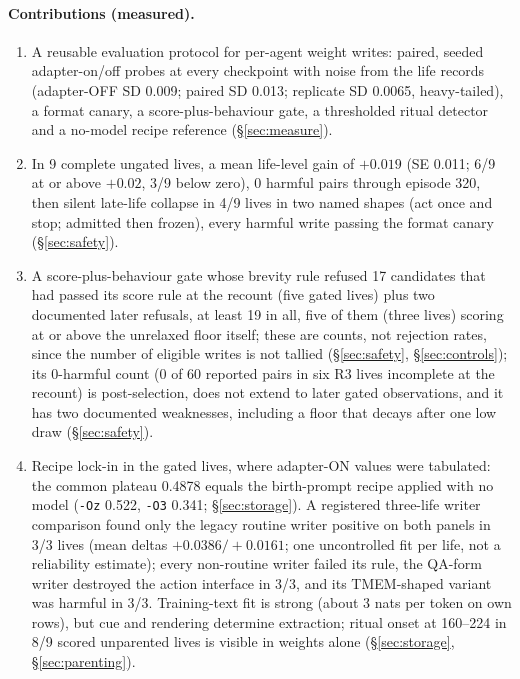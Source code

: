 \documentclass{article}
\begin{document}
\paragraph{Contributions (measured).}
\begin{enumerate}
\item A reusable evaluation protocol for per-agent weight writes: paired, seeded adapter-on/off probes at every checkpoint with noise from the life records (adapter-OFF SD 0.009; paired SD 0.013; replicate SD 0.0065, heavy-tailed), a format canary, a score-plus-behaviour gate, a thresholded ritual detector and a no-model recipe reference (\S\ref{sec:measure}).
\item In 9 complete ungated lives, a mean life-level gain of $+0.019$ (SE 0.011; 6/9 at or above $+0.02$, 3/9 below zero), 0 harmful pairs through episode 320, then silent late-life collapse in 4/9 lives in two named shapes (act once and stop; admitted then frozen), every harmful write passing the format canary (\S\ref{sec:safety}).
\item A score-plus-behaviour gate whose brevity rule refused 17 candidates that had passed its score rule at the recount (five gated lives) plus two documented later refusals, at least 19 in all, five of them (three lives) scoring at or above the unrelaxed floor itself; these are counts, not rejection rates, since the number of eligible writes is not tallied (\S\ref{sec:safety}, \S\ref{sec:controls});
its 0-harmful count (0 of 60 reported pairs in six R3 lives incomplete at the recount) is post-selection, does not extend to later gated observations, and it has two documented weaknesses, including a floor that decays after one low draw (\S\ref{sec:safety}).
\item Recipe lock-in in the gated lives, where adapter-ON values were tabulated: the common plateau 0.4878 equals the birth-prompt recipe applied with no model (\texttt{-Oz} 0.522, \texttt{-O3} 0.341; \S\ref{sec:storage}). A registered three-life writer comparison found only the legacy routine writer positive on both panels in 3/3 lives (mean deltas $+0.0386/+0.0161$; one uncontrolled fit per life, not a reliability estimate); every non-routine writer failed its rule, the QA-form writer destroyed the action interface in 3/3, and its TMEM-shaped variant was harmful in 3/3. Training-text fit is strong (about 3 nats per token on own rows), but cue and rendering determine extraction; ritual onset at 160--224 in 8/9 scored unparented lives is visible in weights alone (\S\ref{sec:storage}, \S\ref{sec:parenting}).

\end{enumerate}
\end{document}
